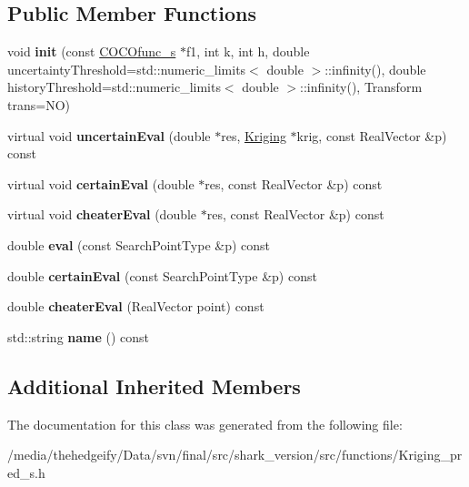 \subsection*{Public Member Functions}
\begin{DoxyCompactItemize}
\item 
void {\bfseries init} (const \hyperlink{classCOCOfunc__s}{C\+O\+C\+Ofunc\+\_\+s} $\ast$f1, int k, int h, double uncertainty\+Threshold=std\+::numeric\+\_\+limits$<$ double $>$\+::infinity(), double history\+Threshold=std\+::numeric\+\_\+limits$<$ double $>$\+::infinity(), Transform trans=NO)\hypertarget{classKriging__pred__s_a7aa9bd341853fe234e960749676824d9}{}\label{classKriging__pred__s_a7aa9bd341853fe234e960749676824d9}

\item 
virtual void {\bfseries uncertain\+Eval} (double $\ast$res, \hyperlink{classKriging}{Kriging} $\ast$krig, const Real\+Vector \&p) const \hypertarget{classKriging__pred__s_acf1762d1199717996837b7b1d44d1df3}{}\label{classKriging__pred__s_acf1762d1199717996837b7b1d44d1df3}

\item 
virtual void {\bfseries certain\+Eval} (double $\ast$res, const Real\+Vector \&p) const \hypertarget{classKriging__pred__s_ad55fde234aa2b3dbc5f9d7b3e0336fb2}{}\label{classKriging__pred__s_ad55fde234aa2b3dbc5f9d7b3e0336fb2}

\item 
virtual void {\bfseries cheater\+Eval} (double $\ast$res, const Real\+Vector \&p) const \hypertarget{classKriging__pred__s_a3597bf534ffa9e8cc316e9db6d5def35}{}\label{classKriging__pred__s_a3597bf534ffa9e8cc316e9db6d5def35}

\item 
double {\bfseries eval} (const Search\+Point\+Type \&p) const \hypertarget{classKriging__pred__s_a1dace8ee7f6b2714c566dd7b1cbb3b58}{}\label{classKriging__pred__s_a1dace8ee7f6b2714c566dd7b1cbb3b58}

\item 
double {\bfseries certain\+Eval} (const Search\+Point\+Type \&p) const \hypertarget{classKriging__pred__s_a4284efd93ef0f8cc62cb2d67ef97e7b7}{}\label{classKriging__pred__s_a4284efd93ef0f8cc62cb2d67ef97e7b7}

\item 
double {\bfseries cheater\+Eval} (Real\+Vector point) const \hypertarget{classKriging__pred__s_abe0fe53572b93b42452cf71f320e82fc}{}\label{classKriging__pred__s_abe0fe53572b93b42452cf71f320e82fc}

\item 
std\+::string {\bfseries name} () const \hypertarget{classKriging__pred__s_af0e5380f207383532b40f47027a6b304}{}\label{classKriging__pred__s_af0e5380f207383532b40f47027a6b304}

\end{DoxyCompactItemize}
\subsection*{Additional Inherited Members}


The documentation for this class was generated from the following file\+:\begin{DoxyCompactItemize}
\item 
/media/thehedgeify/\+Data/svn/final/src/shark\+\_\+version/src/functions/Kriging\+\_\+pred\+\_\+s.\+h\end{DoxyCompactItemize}
